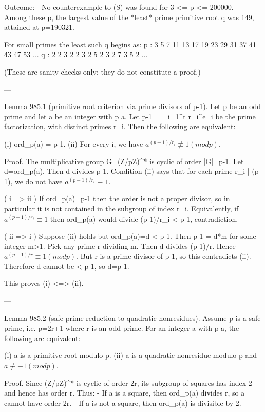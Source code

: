 Outcome:
- No counterexample to (S) was found for 3 <= p <= 200000.
- Among these p, the largest value of the *least* prime primitive root q was 149, attained at
  p=190321.

For small primes the least such q begins as:
  p :  3  5  7 11 13 17 19 23 29 31 37 41 43 47 53 ...
  q :  2  2  3  2  2  3  2  5  2  3  2  7  3  5  2 ...

(These are sanity checks only; they do not constitute a proof.)

---

Lemma 985.1 (primitive root criterion via prime divisors of p-1).
Let p be an odd prime and let a be an integer with p \nmid a. Let p-1 = \prod_{i=1}^t r_i^{e_i}
be the prime factorization, with distinct primes r_i. Then the following are equivalent:

  (i) ord_p(a) = p-1.
  (ii) For every i, we have \(a^{(p-1)/r_i} \not\equiv 1 (mod p)\).

Proof.
The multiplicative group G=(Z/pZ)^* is cyclic of order |G|=p-1.
Let d=ord_p(a). Then d divides p-1. Condition (ii) says that for each prime r_i | (p-1),
we do not have \(a^{(p-1)/r_i} \equiv 1\).

( i => ii ) If ord_p(a)=p-1 then the order is not a proper divisor, so in particular it is not
contained in the subgroup of index r_i. Equivalently, if \(a^{(p-1)/r_i}\equiv 1\) then ord_p(a)
would divide (p-1)/r_i < p-1, contradiction.

( ii => i ) Suppose (ii) holds but ord_p(a)=d < p-1. Then p-1 = d*m for some integer m>1.
Pick any prime r dividing m. Then d divides (p-1)/r. Hence \(a^{(p-1)/r} \equiv 1 (mod p)\).
But r is a prime divisor of p-1, so this contradicts (ii).
Therefore d cannot be < p-1, so d=p-1.

This proves (i) <=> (ii).

---

Lemma 985.2 (safe prime reduction to quadratic nonresidues).
Assume p is a safe prime, i.e. p=2r+1 where r is an odd prime.
For an integer a with p \nmid a, the following are equivalent:

  (i) a is a primitive root modulo p.
  (ii) a is a quadratic nonresidue modulo p and \(a \not\equiv -1 (mod p)\).

Proof.
Since (Z/pZ)^* is cyclic of order 2r, its subgroup of squares has index 2 and hence has
order r. Thus:
- If a is a square, then ord_p(a) divides r, so a cannot have order 2r.
- If a is not a square, then ord_p(a) is divisible by 2.


